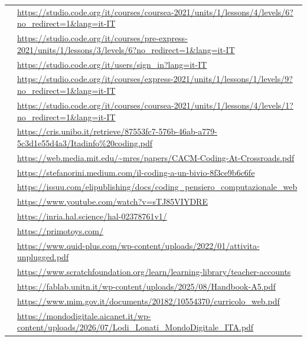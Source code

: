 \begin{longtable}{@{}>{\raggedright\arraybackslash}p{}>{\raggedright\arraybackslash}p{}@{}}
 & \url{https://studio.code.org/it/courses/coursea-2021/units/1/lessons/4/levels/6?no_redirect=1&lang=it-IT} \\[4pt]
 & \url{https://studio.code.org/it/courses/pre-express-2021/units/1/lessons/3/levels/6?no_redirect=1&lang=it-IT} \\[4pt]
 & \url{https://studio.code.org/it/users/sign_in?lang=it-IT} \\[4pt]
 & \url{https://studio.code.org/it/courses/express-2021/units/1/lessons/1/levels/9?no_redirect=1&lang=it-IT} \\[4pt]
 & \url{https://studio.code.org/it/courses/coursea-2021/units/1/lessons/4/levels/1?no_redirect=1&lang=it-IT} \\[4pt]
 & \url{https://cris.unibo.it/retrieve/87553fc7-576b-46ab-a779-5c3d1e55d4a3/Itadinfo\%20coding.pdf} \\[4pt]
 & \url{https://web.media.mit.edu/~mres/papers/CACM-Coding-At-Crossroads.pdf} \\[4pt]
 & \url{https://stefanorini.medium.com/il-coding-a-un-bivio-8f3ce9b6c6fe} \\[4pt]
 & \url{https://issuu.com/elipublishing/docs/coding_pensiero_computazionale_web} \\[4pt]
 & \url{https://www.youtube.com/watch?v=sTJ85VIYDRE} \\[4pt]
 & \url{https://inria.hal.science/hal-02378761v1/} \\[4pt]
 & \url{https://primotoys.com/} \\[4pt]
 & \url{https://www.quid-plus.com/wp-content/uploads/2022/01/attivita-unplugged.pdf} \\[4pt]
 & \url{https://www.scratchfoundation.org/learn/learning-library/teacher-accounts} \\[4pt]
 & \url{https://fablab.unitn.it/wp-content/uploads/2025/08/Handbook-A5.pdf} \\[4pt]
 & \url{https://www.mim.gov.it/documents/20182/10554370/curricolo_web.pdf} \\[4pt]
 & \url{https://mondodigitale.aicanet.it/wp-content/uploads/2026/07/Lodi_Lonati_MondoDigitale_ITA.pdf} \\[4pt]

\end{longtable}
